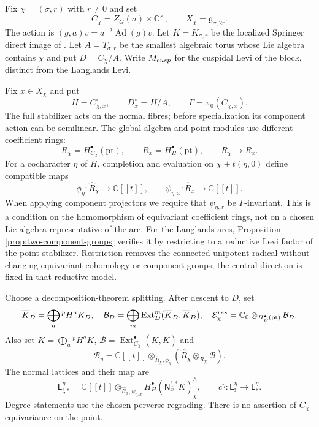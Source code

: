 \documentclass[10pt,a4paper]{amsart}
\newcommand{\C}{\mathbb C}
\newcommand{\A}{\C[[t]]}
\newcommand{\Ext}{\operatorname{Ext}}
\begin{document}
Fix $\chi=(\sigma,r)$ with $r\ne0$ and set
\[
 C_\chi=Z_G(\sigma)\times\mathbb C^\times,\qquad
 X_\chi=\mathfrak g_{\sigma,2r}.
\]
The action is $(g,a)v=a^{-2}\operatorname{Ad}(g)v$.
Let $K=K_{\sigma,r}$ be the localized Springer direct image of
\cite[equations~(2.11)--(2.14)]{Solleveld}.  Let $A=T_{\sigma,r}$ be the
smallest algebraic torus whose Lie algebra contains $\chi$ and put
$D=C_\chi/A$.  Write $M_{\rm cusp}$ for the cuspidal Levi of the block,
distinct from the Langlands Levi.

Fix $x\in X_\chi$ and put
\[
 H=C_{\chi,x}^{\circ},\qquad D_x^\circ=H/A,\qquad
 \Gamma=\pi_0(C_{\chi,x}).
\]
The full stabilizer acts on the normal fibres; before specialization
its component action can be semilinear.
The global algebra and point modules use different coefficient rings:
\[
 R_\chi=H_{C_\chi}^\bullet(\mathrm{pt}),\qquad
 R_x=H_H^\bullet(\mathrm{pt}),\qquad R_\chi\longrightarrow R_x.
\]
For a cocharacter $\eta$ of $H$, completion and evaluation on
$\chi+t(\eta,0)$ define compatible maps
\[
 \phi_\eta:\widehat R_\chi\longrightarrow\A,\qquad
 \psi_{\eta,x}:\widehat R_x\longrightarrow\A.
\]
When applying component projectors we require that $\psi_{\eta,x}$
be $\Gamma$-invariant.  This is a condition on the homomorphism of
equivariant coefficient rings, not on a chosen Lie-algebra representative
of the arc.  For the Langlands arcs, Proposition
\ref{prop:two-component-groups} verifies it by restricting to a reductive
Levi factor of the point stabilizer.  Restriction removes the connected
unipotent radical without changing equivariant cohomology or component
groups; the central direction is fixed in that reductive model.

Choose a decomposition-theorem splitting.  After descent to $D$, set
\[
 \overline K_D=\bigoplus_a{}^pH^aK_D,\quad
 \mathcal B_D=\bigoplus_m\Ext_D^m(\overline K_D,\overline K_D),\quad
 \mathcal E_\chi^{\rm res}
 =\mathbb C_0\otimes_{H_D^\bullet(\mathrm{pt})}\mathcal B_D.
\]
Also set $\overline K=\bigoplus_a{}^pH^aK$,
$\mathcal B=\Ext^\bullet_{C_\chi}(\overline K,\overline K)$ and
\[
 \mathcal B_\eta=\A\otimes_{\widehat R_\chi,\phi_\eta}
       (\widehat R_\chi\otimes_{R_\chi}\mathcal B).
\]
The normal lattices and their map are
\begin{equation}\label{eq:normal-arc-lattices}
 \mathsf L_{!,*}^{\eta}
 =\A\otimes_{\widehat R_x,\psi_{\eta,x}}
   H_H^\bullet(\mathsf N_x^{!,*}K)^\wedge_\chi,\qquad
 c^\eta:\mathsf L_!^\eta\longrightarrow\mathsf L_*^\eta.
\end{equation}
Degree statements use the chosen perverse regrading.  There is no
assertion of $C_\chi$-equivariance on the point.
\end{document}
